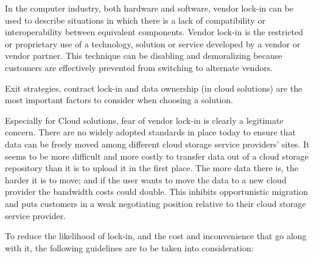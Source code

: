 In the computer industry, both hardware and software, vendor lock-in can
be used to describe situations in which there is a lack of compatibility
or interoperability between equivalent components. Vendor lock-in is the
restricted or proprietary use of a technology, solution or service
developed by a vendor or vendor partner. This technique can be disabling
and demoralizing because customers are effectively prevented from
switching to alternate vendors.

Exit strategies, contract lock-in and data ownership (in cloud
solutions) are the most important factors to consider when choosing a
solution. %

Especially for Cloud solutions, fear of vendor lock-in is clearly a
legitimate concern. There are no widely adopted standards in place today
to ensure that data can be freely moved among different cloud storage
service providers’ sites. It seems to be more difficult and more costly
to transfer data out of a cloud storage repository than it is to upload
it in the first place. The more data there is, the harder it is to move;
and if the user wants to move the data to a new cloud provider the
bandwidth costs could double. This inhibits opportunistic migration and
puts customers in a weak negotiating position relative to their cloud
storage service provider.

To reduce the likelihood of lock-in, and the cost and inconvenience that
go along with it, the following guidelines are to be taken into
consideration:

